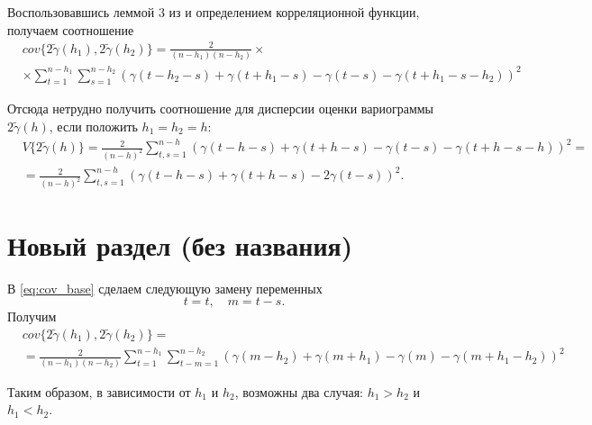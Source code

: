 Воспользовавшись леммой 3 из \cite{tsekhavaya-brest} и определением корреляционной функции, получаем соотношение
\begin{eqnarray}
\nonumber
\label{eq:cov_base}
	& cov\{ 2 \tilde{\gamma}(h_1), 2 \tilde{\gamma}(h_2) \} = \frac{2}{(n - h_1)(n - h_2)} \times \\
	& \times \sum_{t = 1}^{n - h_1}\sum_{s = 1}^{n - h_2} (\gamma(t - h_2 - s) + \gamma(t + h_1 - s) - \gamma(t - s) - \gamma(t + h_1 - s - h_2))^2
\end{eqnarray}

Отсюда нетрудно получить соотношение для дисперсии оценки вариограммы $ 2 \tilde{\gamma}(h) $, если положить $ h_1 = h_2 = h $:
\begin{eqnarray*}
\nonumber
	& V \{ 2 \tilde{\gamma}(h) \} = \frac{2}{(n - h)^2}\sum_{t,s = 1}^{n - h} ( \gamma(t - h - s) + \gamma(t + h - s) - \gamma(t - s) - \gamma(t + h - s - h) )^2 = \\
	& = \frac{2}{(n-h)^2}\sum_{t,s = 1}^{n - h} ( \gamma(t - h - s) + \gamma(t + h - s) - 2\gamma(t - s) )^2.
\end{eqnarray*}


\section{Новый раздел (без названия)} %
\label{sec:new_section}

В \eqref{eq:cov_base} сделаем следующую замену переменных
\begin{equation*}
	t = t, \quad m = t - s.
\end{equation*}
Получим
\begin{eqnarray}
\nonumber
\label{eq:cov_split}
	& cov\{ 2 \tilde{\gamma}(h_1), 2 \tilde{\gamma}(h_2) \} = \\
	& = \frac{2}{(n - h_1) (n - h_2)} \sum_{t = 1}^{n - h_1}\sum_{t - m = 1}^{n - h_2} (\gamma(m - h_2) + \gamma(m + h_1) - \gamma(m) - \gamma(m + h_1 - h_2))^2
\end{eqnarray}

Таким образом, в зависимости от $h_1$ и $h_2$, возможны два случая: $h_1 > h_2$ и $h_1 < h_2$.


